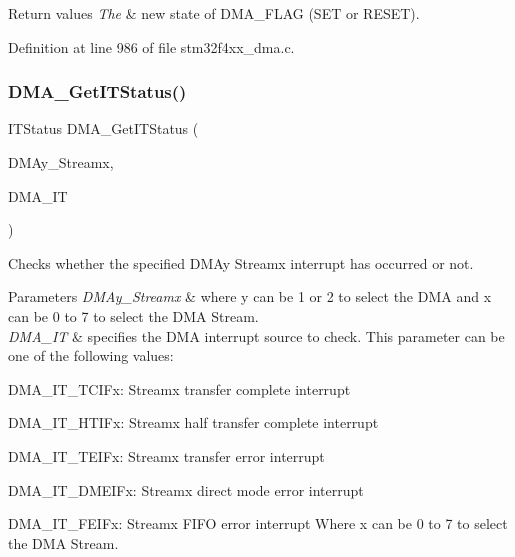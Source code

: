 \begin{DoxyRetVals}{Return values}
{\em The} & new state of D\+M\+A\+\_\+\+F\+L\+AG (S\+ET or R\+E\+S\+ET). \\
\hline
\end{DoxyRetVals}


Definition at line 986 of file stm32f4xx\+\_\+dma.\+c.

\mbox{\label{group___d_m_a_gad0ccf5f6548bd7cf8f2cae30393bb716}} 
\subsubsection{\texorpdfstring{D\+M\+A\+\_\+\+Get\+I\+T\+Status()}{DMA\_GetITStatus()}}
{\footnotesize\ttfamily I\+T\+Status D\+M\+A\+\_\+\+Get\+I\+T\+Status (\begin{DoxyParamCaption}\item[{\hyperlink{struct_d_m_a___stream___type_def}{D\+M\+A\+\_\+\+Stream\+\_\+\+Type\+Def} $\ast$}]{D\+M\+Ay\+\_\+\+Streamx,  }\item[{uint32\+\_\+t}]{D\+M\+A\+\_\+\+IT }\end{DoxyParamCaption})}



Checks whether the specified D\+M\+Ay Streamx interrupt has occurred or not. 


\begin{DoxyParams}{Parameters}
{\em D\+M\+Ay\+\_\+\+Streamx} & where y can be 1 or 2 to select the D\+MA and x can be 0 to 7 to select the D\+MA Stream. \\
\hline
{\em D\+M\+A\+\_\+\+IT} & specifies the D\+MA interrupt source to check. This parameter can be one of the following values\+: \begin{DoxyItemize}
\item D\+M\+A\+\_\+\+I\+T\+\_\+\+T\+C\+I\+Fx\+: Streamx transfer complete interrupt \item D\+M\+A\+\_\+\+I\+T\+\_\+\+H\+T\+I\+Fx\+: Streamx half transfer complete interrupt \item D\+M\+A\+\_\+\+I\+T\+\_\+\+T\+E\+I\+Fx\+: Streamx transfer error interrupt \item D\+M\+A\+\_\+\+I\+T\+\_\+\+D\+M\+E\+I\+Fx\+: Streamx direct mode error interrupt \item D\+M\+A\+\_\+\+I\+T\+\_\+\+F\+E\+I\+Fx\+: Streamx F\+I\+FO error interrupt Where x can be 0 to 7 to select the D\+MA Stream. \end{DoxyItemize}
\\
\hline
\end{DoxyParams}

